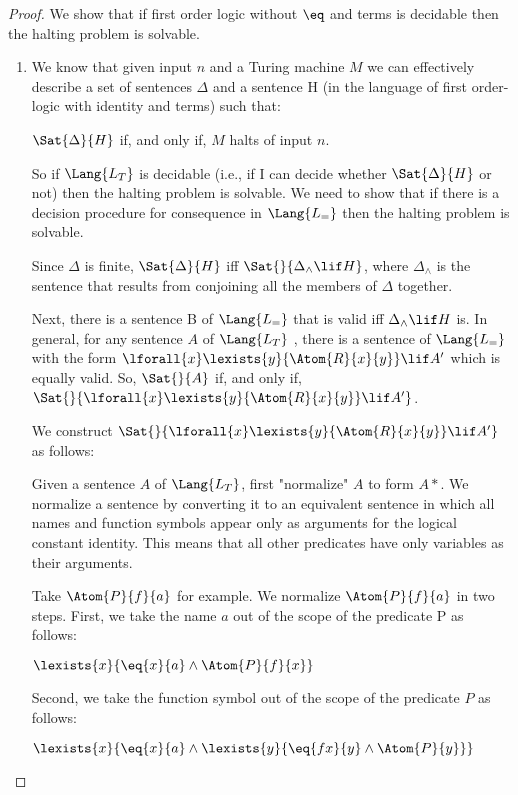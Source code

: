 \documentclass[../../include/open-logic-section]{subfiles}
\begin{document}

\begin{proof}
We show that if first order logic without $\eq$ and terms is decidable then the halting problem is solvable.
\begin{enumerate}
\item We know that given input $n$ and a Turing machine $M$ we can effectively describe a set of sentences $\Delta$ and a sentence H (in the language of first order-logic with identity and terms) such that:

$\Sat{\Delta}{H}$ if, and only if, $M$ halts of input $n$.

So if $\Lang{L_T}$ is decidable (i.e., if I can decide whether $\Sat{\Delta}{H}$ or not) then the halting problem is solvable. We need to show that if there is a decision procedure for consequence in $\Lang{L_=}$ then the halting problem is solvable.

Since $\Delta$ is finite, $\Sat{\Delta}{H}$  iff $\Sat{}{\Delta_\land \lif H}$, where $\Delta_\land$ is the sentence that results from conjoining all the members of $\Delta$ together.

Next, there is a sentence B of $\Lang{L_=}$ that is valid iff $\Delta_\land \lif H$ is. In general, for any sentence $A$ of $\Lang{L_T}$ , there is a sentence of $\Lang{L_=}$ with the form $\lforall{x}\lexists{y}{\Atom{R}{x}{y}}\lif A'$ which is equally valid. So, $\Sat{}{A}$ if, and only if, $\Sat{}{\lforall{x}\lexists{y}{\Atom{R}{x}{y}}\lif A'}$.

We construct $\Sat{}{\lforall{x}\lexists{y}{\Atom{R}{x}{y}}\lif A'}$ as follows:

Given a sentence $A$ of $\Lang{L_T}$, first "normalize" $A$ to form $A*$. We normalize a sentence by converting it to an equivalent sentence in which all names and function symbols appear only as arguments for the logical constant identity. This means that all other predicates have only variables as their arguments.

Take $\Atom{P}{f}{a}$ for example. We normalize $\Atom{P}{f}{a}$ in two steps. First, we take the name $a$ out of the scope of the predicate P as follows:

$\lexists{x}{\eq{x}{a} \land \Atom{P}{f}{x}}$

Second, we take the function symbol out of the scope of the predicate $P$ as follows:

$\lexists{x}{\eq{x}{a} \land \lexists{y}{\eq{fx}{y} \land \Atom{P}{y}}}$


\end{enumerate}
\end{proof}
\end{document}
